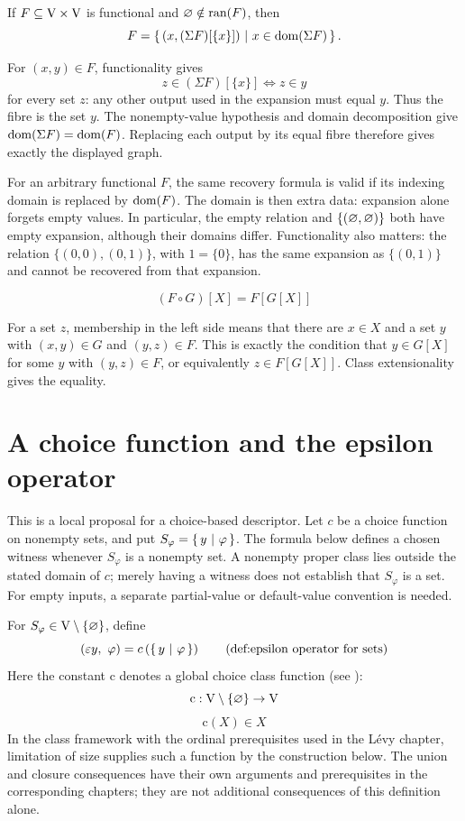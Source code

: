 \begin{theorem}
If $F\subseteq\mathrm{V}\times\mathrm{V}$ is functional and
$\varnothing\notin\mbox{ran}(F)$, then
\[
F=\left\{\,(x,(\Sigma F)[\{x\}])\ \middle|\ x\in\mathrm{dom}(\Sigma F)\,\right\}.
\]
\end{theorem}
\Proof
For $(x,y)\in F$, functionality gives
\[
z\in(\Sigma F)[\{x\}]\iff z\in y
\]
for every set $z$: any other output used in the expansion must equal
$y$. Thus the fibre is the set $y$. The nonempty-value hypothesis and
domain decomposition give $\mathrm{dom}(\Sigma F)=\mathrm{dom}(F)$. Replacing each
output by its equal fibre therefore gives exactly the displayed graph.
\Done

\begin{remark}
For an arbitrary functional $F$, the same recovery formula is valid if
its indexing domain is replaced by $\mathrm{dom}(F)$. The domain is then extra
data: expansion alone forgets empty values. In particular, the empty
relation and $\{(\varnothing,\varnothing)\}$ both have empty expansion,
although their domains differ. Functionality also matters: the relation
$\{(0,0),(0,1)\}$, with $1=\{0\}$, has the same expansion as
$\{(0,1)\}$ and cannot be recovered from that expansion.
\end{remark}

\begin{theorem}
\[
(F \circ G)[X]=F[G[X]]
\]
\end{theorem}
\Proof
For a set $z$, membership in the left side means that there are $x\in X$
and a set $y$ with $(x,y)\in G$ and $(y,z)\in F$. This is exactly the
condition that $y\in G[X]$ for some $y$ with $(y,z)\in F$, or equivalently
$z\in F[G[X]]$. Class extensionality gives the equality.
\Done
\section{A choice function and the epsilon operator}
This is a local proposal for a choice-based descriptor. Let $c$ be a
choice function on nonempty sets, and put $S_\varphi=\left\{\,y\ \middle|\ \varphi\,\right\}$.
The formula below defines a chosen witness whenever $S_\varphi$ is a
nonempty set. A nonempty proper class lies outside the stated domain of
$c$; merely having a witness does not establish that $S_\varphi$ is a set.
For empty inputs, a separate partial-value or default-value convention
is needed.

\begin{definition}
For $S_\varphi\in\mathrm{V}\setminus\{\varnothing\}$, define
\[
(\varepsilon y,\  \varphi) = c\left(\cc{y}{\varphi}\right)
\labeltagd{def}{epsilon operator for sets}
\]
Here the constant $\text{c}$ denotes a global choice class function (see ):
\[
\text{c}:\mathrm{V}\setminus\{\varnothing\}\to \mathrm{V}
\]
\[
\text{c}(X)\in X
\]
In the class framework with the ordinal prerequisites used in the
L\'evy chapter, limitation of size supplies such a function by the
construction below. The union and closure consequences have their
own arguments and prerequisites in the corresponding chapters; they
are not additional consequences of this definition alone.
\end{definition}

